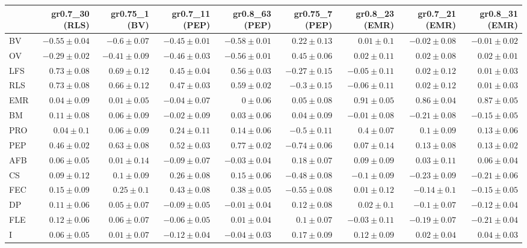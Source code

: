\begin{landscape}
\begin{table}
\begin{footnotesize}
\begin{tabular}{@{}l|rrrrrrrr@{}}
\toprule
  & gr0.7\_30 (RLS) & gr0.75\_1 (BV) & gr0.7\_11 (PEP) & gr0.8\_63 (PEP) & gr0.75\_7 (PEP) & gr0.8\_23 (EMR) & gr0.7\_21 (EMR) & gr0.8\_31 (EMR)\\
\midrule
BV & $-0.55 \pm 0.04$ & $-0.6 \pm 0.07$ & $-0.45 \pm 0.01$ & $-0.58 \pm 0.01$ & $0.22 \pm 0.13$ & $0.01 \pm 0.1$ & $-0.02 \pm 0.08$ & $-0.01 \pm 0.02$\\
OV & $-0.29 \pm 0.02$ & $-0.41 \pm 0.09$ & $-0.46 \pm 0.03$ & $-0.56 \pm 0.01$ & $0.45 \pm 0.06$ & $0.02 \pm 0.11$ & $0.02 \pm 0.08$ & $0.02 \pm 0.01$\\
LFS & $0.73 \pm 0.08$ & $0.69 \pm 0.12$ & $0.45 \pm 0.04$ & $0.56 \pm 0.03$ & $-0.27 \pm 0.15$ & $-0.05 \pm 0.11$ & $0.02 \pm 0.12$ & $0.01 \pm 0.03$\\
RLS & $0.73 \pm 0.08$ & $0.66 \pm 0.12$ & $0.47 \pm 0.03$ & $0.59 \pm 0.02$ & $-0.3 \pm 0.15$ & $-0.06 \pm 0.11$ & $0.02 \pm 0.12$ & $0.01 \pm 0.03$\\
EMR & $0.04 \pm 0.09$ & $0.01 \pm 0.05$ & $-0.04 \pm 0.07$ & $0 \pm 0.06$ & $0.05 \pm 0.08$ & $0.91 \pm 0.05$ & $0.86 \pm 0.04$ & $0.87 \pm 0.05$\\
BM & $0.11 \pm 0.08$ & $0.06 \pm 0.09$ & $-0.02 \pm 0.09$ & $0.03 \pm 0.06$ & $0.04 \pm 0.09$ & $-0.01 \pm 0.08$ & $-0.21 \pm 0.08$ & $-0.15 \pm 0.05$\\
PRO & $0.04 \pm 0.1$ & $0.06 \pm 0.09$ & $0.24 \pm 0.11$ & $0.14 \pm 0.06$ & $-0.5 \pm 0.11$ & $0.4 \pm 0.07$ & $0.1 \pm 0.09$ & $0.13 \pm 0.06$\\
PEP & $0.46 \pm 0.02$ & $0.63 \pm 0.08$ & $0.52 \pm 0.03$ & $0.77 \pm 0.02$ & $-0.74 \pm 0.06$ & $0.07 \pm 0.14$ & $0.13 \pm 0.08$ & $0.13 \pm 0.02$\\
AFB & $0.06 \pm 0.05$ & $0.01 \pm 0.14$ & $-0.09 \pm 0.07$ & $-0.03 \pm 0.04$ & $0.18 \pm 0.07$ & $0.09 \pm 0.09$ & $0.03 \pm 0.11$ & $0.06 \pm 0.04$\\
CS & $0.09 \pm 0.12$ & $0.1 \pm 0.09$ & $0.26 \pm 0.08$ & $0.15 \pm 0.06$ & $-0.48 \pm 0.08$ & $-0.1 \pm 0.09$ & $-0.23 \pm 0.09$ & $-0.21 \pm 0.06$\\
FEC & $0.15 \pm 0.09$ & $0.25 \pm 0.1$ & $0.43 \pm 0.08$ & $0.38 \pm 0.05$ & $-0.55 \pm 0.08$ & $0.01 \pm 0.12$ & $-0.14 \pm 0.1$ & $-0.15 \pm 0.05$\\
DP & $0.11 \pm 0.06$ & $0.05 \pm 0.07$ & $-0.09 \pm 0.05$ & $-0.01 \pm 0.04$ & $0.12 \pm 0.08$ & $0.02 \pm 0.1$ & $-0.1 \pm 0.07$ & $-0.12 \pm 0.04$\\
FLE & $0.12 \pm 0.06$ & $0.06 \pm 0.07$ & $-0.06 \pm 0.05$ & $0.01 \pm 0.04$ & $0.1 \pm 0.07$ & $-0.03 \pm 0.11$ & $-0.19 \pm 0.07$ & $-0.21 \pm 0.04$\\
I & $0.06 \pm 0.05$ & $0.01 \pm 0.07$ & $-0.12 \pm 0.04$ & $-0.04 \pm 0.03$ & $0.17 \pm 0.09$ & $0.12 \pm 0.09$ & $0.02 \pm 0.04$ & $0.04 \pm 0.03$\\
\bottomrule
\end{tabular}


\end{footnotesize}
\end{table}
\end{landscape}
